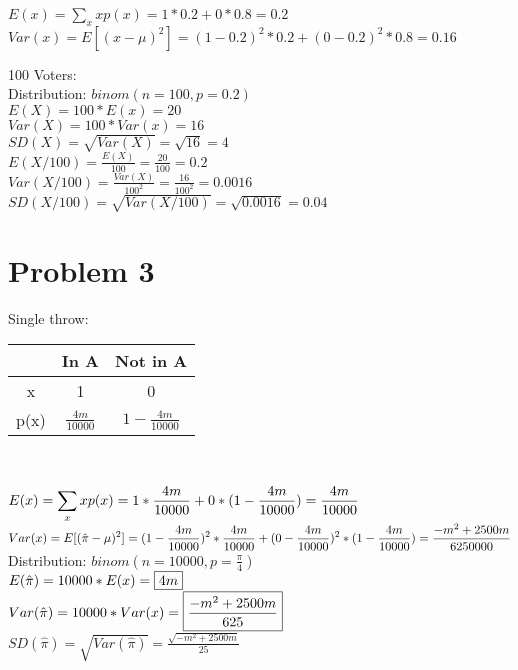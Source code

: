 \documentclass{article}
\begin{document}
\begin{flushleft}
	$E(x)=\sum_x xp(x)=1*0.2+0*0.8=0.2$\\
	$Var(x)=E[(x-\mu)^2]=(1-0.2)^2*0.2+(0-0.2)^2*0.8=0.16$\\
\end{flushleft}

\begin{flushleft}
	100 Voters:\\
	Distribution: $\boxed{binom(n=100, p=0.2)}$\\
	$E(X)=100*E(x)=\boxed{20}$\\
	$Var(X)=100*Var(x)=\boxed{16}$\\
	$SD(X)=\sqrt{Var(X)}=\sqrt{16}=\boxed{4}$\\
	$E(X/100)=\frac{E(X)}{100}=\frac{20}{100}=\boxed{0.2}$\\
	$Var(X/100)=\frac{Var(X)}{100^2}=\frac{16}{100^2}=\boxed{0.0016}$\\
	$SD(X/100)=\sqrt{Var(X/100)}=\sqrt{0.0016}=\boxed{0.04}$\\
\end{flushleft}

\section*{Problem 3}
\begin{flushleft}
	Single throw:\\
	\begin{tabular}{|c|c|c|}
		\hline
		     & In A               & Not in A             \\
		\hline
		x    & 1                  & 0                    \\
		\hline
		p(x) & $\frac{4m}{10000}$ & $1-\frac{4m}{10000}$ \\
		\hline
	\end{tabular}\\

	\begin{flushleft}
		$\mathlarger{E(x)=\sum_x xp(x)=1*\frac{4m}{10000}+0*(1-\frac{4m}{10000})=\frac{4m}{10000}}$\\
		$\mathlarger{Var(x)=E[(\hat{\pi}-\mu)^2]=(1-\frac{4m}{10000})^2*{\frac{4m}{10000}}+(0-\frac{4m}{10000})^2*(1-\frac{4m}{10000})=\frac{-m^2+2500m}{6250000}}$\\
		Distribution: $\boxed{binom(n=10000 ,p=\frac{\pi}{4})}$\\
		$\mathlarger{E(\hat{\pi})=10000*E(x)=\boxed{4m}}$\\
		$\mathlarger{Var(\hat{\pi})=10000*Var(x)=\boxed{\frac{-m^2+2500m}{625}}}$\\
		$SD(\hat{\pi})=\sqrt{Var(\hat{\pi})}=\boxed{\frac{\sqrt{-m^2+2500m}}{25}}$\\
	\end{flushleft}
\end{flushleft}
\end{document}
